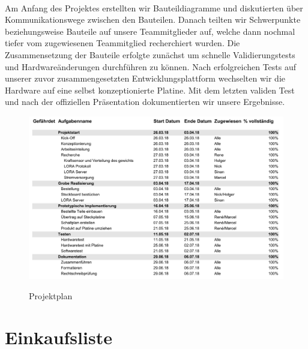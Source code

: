 \\
Am Anfang des Projektes erstellten wir Bauteildiagramme und diskutierten über Kommunikationswege zwischen den Bauteilen. Danach teilten wir Schwerpunkte beziehungsweise Bauteile auf unsere Teammitglieder auf, welche dann nochmal tiefer vom zugewiesenen Teammitglied recherchiert wurden. Die Zusammensetzung der Bauteile erfolgte zunächst um schnelle Validierungstests und Hardwareänderungen durchführen zu können. Nach erfolgreichen Tests auf unserer zuvor zusammengesetzten Entwicklungsplattform wechselten wir die Hardware auf eine selbst konzeptionierte Platine. Mit dem letzten validen Test und nach der offiziellen Präsentation dokumentierten wir unsere Ergebnisse.

\begin{figure}[H]
    \center
    \includegraphics[width=15cm]{Bilder/projektplan.png}\\
    \caption{Projektplan}
    \label{fig:Projektplan}
\end{figure}
\chapter{Einkaufsliste}


